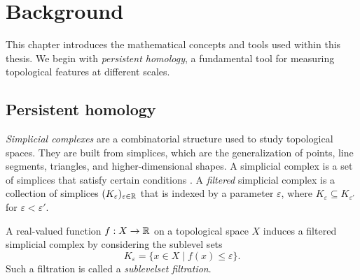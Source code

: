 \chapter{Background}

This chapter introduces the mathematical concepts and tools used within this
thesis. We begin with \emph{persistent homology}, a fundamental tool for
measuring topological features at different scales. 

\section{Persistent homology}

\emph{Simplicial complexes} are a combinatorial structure used to study topological
spaces. They are built from simplices, which are the generalization of
points, line segments, triangles, and higher-dimensional shapes. A simplicial
complex is a set of simplices that satisfy certain conditions .
A \emph{filtered} simplicial complex is a collection of simplices
$(K_\varepsilon)_{\varepsilon \in \mathbb{R}}$ that is indexed by a parameter $\varepsilon$,
where $K_\varepsilon \subseteq K_{\varepsilon'}$ for $\varepsilon < \varepsilon'$.

A real-valued function $f: X \to \mathbb{R}$ on a topological space $X$ induces a
filtered simplicial complex by considering the sublevel sets
\[
    K_\varepsilon = \{ x \in X \mid f(x) \leq \varepsilon \}.
\]
Such a filtration is called a \emph{sublevelset filtration}.

